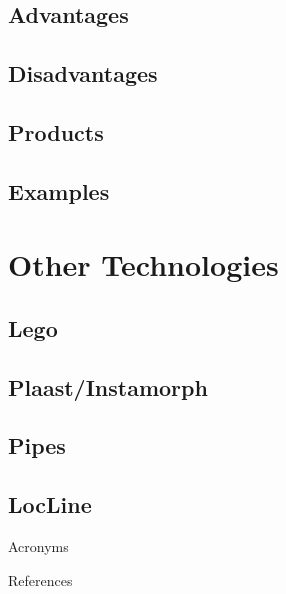 \documentclass[aspectratio=169]{beamer}
\begin{document}
\subsection{Advantages}

\subsection{Disadvantages}

\subsection{Products}

\subsection{Examples}



\section{Other Technologies}

\subsection{Lego \texttrademark}

\subsection{Plaast/Instamorph}

\subsection{ Pipes}

\subsection{LocLine}


\appendix

\begin{frame}[allowframebreaks]{Acronyms}
    \printglossary[type=\acronymtype, nonumberlist]
\end{frame}

\begin{frame}[label=references]{References}
    
\end{frame}
\end{document}
